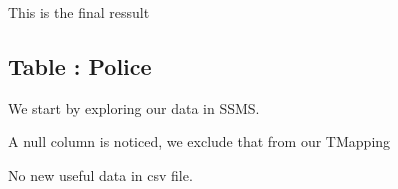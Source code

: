 This is the final ressult
\begin{figure}[H]
\centering
{}
\end{figure}



\subsection{Table : Police}
We start by exploring our data in SSMS.
\begin{figure}[H]
\centering
{}
\end{figure}

A null column is noticed, we exclude that from our TMapping 
\begin{figure}[H]
\centering
{}
\end{figure}

No new useful data in csv file.
\begin{figure}[H]
\centering
{}
\end{figure}

